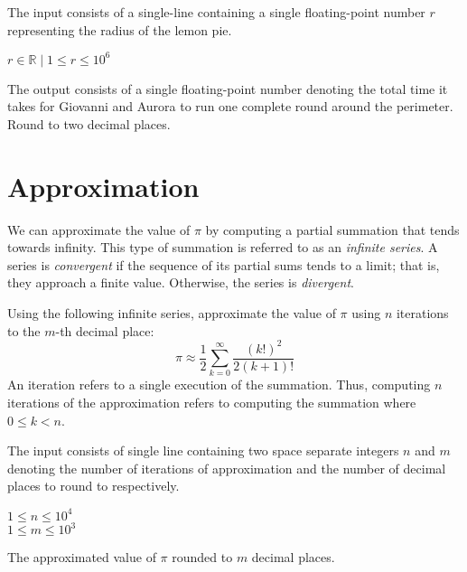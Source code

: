 \documentclass{contest-set}
\begin{document}

The input consists of a single-line containing a single floating-point number $r$ representing the radius of the lemon pie.

\constraints
$r \in \mathbb{R} \mid 1 \leq r \leq 10^6$

\outputformat
The output consists of a single floating-point number denoting the total time it takes for Giovanni and Aurora to run one complete round around the perimeter. Round to two decimal places.

\pushnewpage
{}

\clearpage
\section{Approximation}
We can approximate the value of $\pi$ by computing a partial summation that tends towards infinity. This type of summation is referred to as an \textit{infinite series}. A series is \textit{convergent} if the sequence of its partial sums tends to a limit; that is, they approach a finite value. Otherwise, the series is \textit{divergent}.

Using the following infinite series, approximate the value of $\pi$ using $n$ iterations to the $m$-th decimal place:
\begin{equation*}
    \pi \approx \frac{1}{2}\sum^\infty_{k=0}\frac{(k!)^2}{2(k+1)!}
\end{equation*}
An iteration refers to a single execution of the summation. Thus, computing $n$ iterations of the approximation refers to computing the summation where $0 \leq k < n$.

The input consists of single line containing two space separate integers $n$ and $m$ denoting the number of iterations of approximation and the number of decimal places to round to respectively.

\constraints
$1 \leq n \leq 10^4$\\
$1 \leq m \leq 10^3$

\outputformat
The approximated value of $\pi$ rounded to $m$ decimal places.


\newpage
\end{document}
